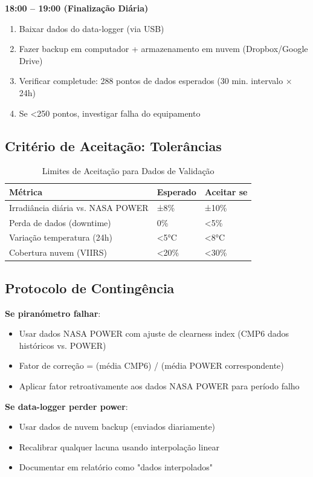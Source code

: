 \documentclass[12pt, a4paper]{article}
\begin{document}
\textbf{18:00 – 19:00 (Finalização Diária)}
\begin{enumerate}
\item Baixar dados do data-logger (via USB)
\item Fazer backup em computador + armazenamento em nuvem (Dropbox/Google Drive)
\item Verificar completude: 288 pontos de dados esperados (30 min. intervalo × 24h)
\item Se <250 pontos, investigar falha do equipamento
\end{enumerate}

\subsection{Critério de Aceitação: Tolerâncias}

\begin{table}[H]
\centering
\caption{Limites de Aceitação para Dados de Validação}
\label{tab:acceptance_criteria}
\small
\begin{tabular}{lll}
\toprule
\rowcolor{LightBlue}\textbf{Métrica} & \textbf{Esperado} & \textbf{Aceitar se} \\
\midrule
Irradiância diária vs. NASA POWER & ±8\% & ±10\% \\
Perda de dados (downtime) & 0\% & <5\% \\
Variação temperatura (24h) & <5°C & <8°C \\
Cobertura nuvem (VIIRS) & <20\% & <30\% \\
\bottomrule
\end{tabular}
\end{table}

\subsection{Protocolo de Contingência}

\textbf{Se piranómetro falhar}:
\begin{itemize}
\item Usar dados NASA POWER com ajuste de clearness index (CMP6 dados históricos vs. POWER)
\item Fator de correção = (média CMP6) / (média POWER correspondente)
\item Aplicar fator retroativamente aos dados NASA POWER para período falho
\end{itemize}

\textbf{Se data-logger perder power}:
\begin{itemize}
\item Usar dados de nuvem backup (enviados diariamente)
\item Recalibrar qualquer lacuna usando interpolação linear
\item Documentar em relatório como "dados interpolados"
\end{itemize}
\end{document}
